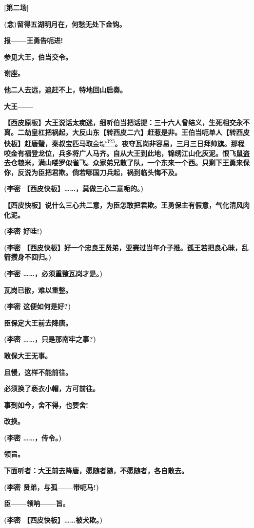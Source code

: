 \textbf{{[}第二场{]}}

\textbf{(念)留得五湖明月在，何愁无处下金钩。}

\textbf{报------王勇告呃进!}

\textbf{参见大王，伯当交令。}

\textbf{谢座。}

\textbf{他二人去远，追赶不上，特地回山启奏。}

\textbf{大王------}

\textbf{【西皮原板】大王说话太痴迷，细听伯当把话提：三十六人曾结义，生死相交永不离。二劫皇杠把祸起，大反山东【转西皮二六】赶惹是非。王伯当呃单人【转西皮快板】赶唐璧，秦叔宝匹马取}金堤\protect\hyperlink{fn325}{\textsuperscript{325}}\textbf{。夜夺瓦岗非容易，三月三日拜帅旗。那程咬金有福登龙位，兵多将广人马齐。自从大王到此地，锦绣江山化灰泥。恨飞鼠盗去仓粮米，满山喽罗似雀飞。众家弟兄散了队，一个东来一个西。只剩下王勇来保你，反说为臣把君欺。倘若哪国刀兵起，祸到临头悔不及。}

\textbf{(李密 【西皮快板】\ldots{}\ldots{}，莫做三心二意呃的。)}

\textbf{【西皮快板】说什么三心共二意，为臣怎敢把君欺。王勇保主有假意，气化清风肉化泥。}

\textbf{(李密 好哇!)}

\textbf{(李密
【西皮快板】好一个忠良王贤弟，亚赛过当年介子推。孤王若把良心昧，乱箭攒身不回归。)}

\textbf{(李密 \ldots{}\ldots{}，必须重整瓦岗才是。)}

\textbf{瓦岗已散，难以重整。}

\textbf{(李密 这便如何是好?)}

\textbf{臣保定大王前去降唐。}

\textbf{(李密 \ldots{}\ldots{}，只是那南牢之事?)}

\textbf{敢保大王无事。}

\textbf{且慢，这样不能前往。}

\textbf{必须换了亵衣小帽，方可前往。}

\textbf{事到如今，舍不得，也要舍!}

\textbf{改换。}

\textbf{(李密 \ldots{}\ldots{}，传令。)}

\textbf{领旨。}

\textbf{下面听者：大王前去降唐，愿随者随，不愿随者，各自散去。}

\textbf{(李密 贤弟，与孤------带呃马!)}

\textbf{臣------领呐------旨。}

\textbf{(李密 【西皮快板】\ldots{}\ldots{}被犬欺。)}

